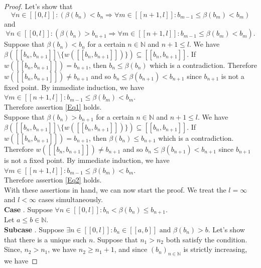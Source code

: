 \documentclass[10pt,a4paper]{amsart}
\newcommand*\circled[1]{\tikz[baseline=(char.base)]{
            \node[shape=circle,draw,inner sep=2pt] (char) {#1};}}
\begin{document}
\begin{proof}
Let's show that 
\begin{equation}
\label{Eq1}
\boxed{\forall n \in [\![0,l]\!] : \left( \beta(b_n) < b_n \Rightarrow \forall m \in [\![n+1,l]\!] : b_{m-1} \leq \beta(b_m) < b_m \right) }
\end{equation}
and
\begin{equation}
\label{Eq2}
\boxed{\forall n \in [\![0,l]\!] : \left( \beta(b_n) > b_{n+1} \Rightarrow \forall m \in [\![n+1,l]\!] : b_{m-1} \leq \beta(b_m) < b_m \right) }.
\end{equation}
Suppose that $\beta(b_n) < b_n$ for a certain $n \in \mathbb{N}$ and $n+1 \leq l$. We have ${\beta([\![b_n,b_{n+1}]\!] \setminus \{w([\![b_n,b_{n+1}]\!])\}) \subseteq [\![b_n,b_{n+1}]\!]}$. If $w([\![b_n,b_{n+1}]\!]) = b_{n+1}$, then $b_n \leq \beta(b_n)$ which is a contradiction. Therefore $w([\![b_n,b_{n+1}]\!]) \neq b_{n+1}$ and so $b_n \leq \beta(b_{n+1}) < b_{n+1}$ since $b_{n+1}$ is not a fixed point. By immediate induction, we have ${\forall m \in [\![n+1,l]\!] : b_{m-1} \leq \beta(b_m) < b_m}$. \\
Therefore assertion \ref{Eq1} holds. \\
Suppose that $\beta(b_n) > b_{n+1}$ for a certain $n \in \mathbb{N}$ and $n + 1 \leq l$. We have ${\beta([\![b_n,b_{n+1}]\!] \setminus \{w([\![b_n,b_{n+1}]\!])\}) \subseteq [\![b_n,b_{n+1}]\!]}$. If $w([\![b_n,b_{n+1}]\!]) = b_{n+1}$, then ${\beta(b_n) \leq b_{n+1}}$ which is a contradiction. Therefore $w([\![b_n,b_{n+1}]\!]) \neq b_{n+1}$ and so ${b_n \leq \beta(b_{n+1}) < b_{n+1}}$ since $b_{n+1}$ is not a fixed point. By immediate induction, we have ${\forall m \in [\![n+1,l]\!] : b_{m-1} \leq \beta(b_m) < b_m}$. \\
Therefore assertion \ref{Eq2} holds. \\
With these assertions in hand, we can now start the proof. We treat the $l = \infty$ and $l < \infty$ cases simultaneously. \\
\textbf{Case \circled{1}}. Suppose $\forall n \in [\![0,l]\!] : b_n < \beta(b_n) \leq b_{n+1}$. \\
Let $a \leq b \in \mathbb{N}$. \\
\textbf{Subcase \circled{1.1}}. Suppose $\exists n \in [\![0,l]\!] : b_n \in [\![a,b]\!] \text{ and } \beta(b_n) > b$. Let's show that there is a unique such $n$. Suppose that $n_1 > n_2$ both satisfy the condition. Since, $n_2 > n_1$, we have $n_2 \geq n_1 + 1$, and since $(b_n)_{n \in \mathbb{N}}$ is strictly increasing, we have 

\end{proof}
\end{document}
